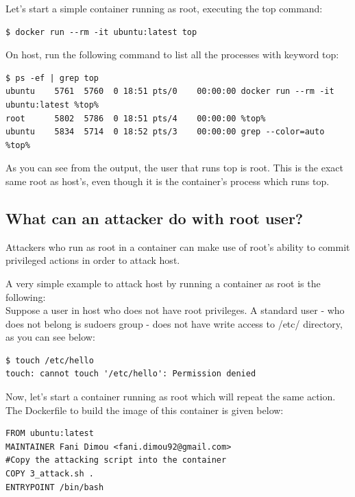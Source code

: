 Let's start a simple container running as root, executing the top command:

\begin{lstlisting}[style=dockercommands]
$ docker run --rm -it ubuntu:latest top
\end{lstlisting}

On host, run the following command to list all the processes with keyword top:
\begin{lstlisting}[style=terminal, basicstyle={\fontsize{10}{11}\color{black}\ttfamily}]
$ ps -ef | grep top
ubuntu    5761  5760  0 18:51 pts/0    00:00:00 docker run --rm -it ubuntu:latest %top%
root      5802  5786  0 18:51 pts/4    00:00:00 %top%
ubuntu    5834  5714  0 18:52 pts/3    00:00:00 grep --color=auto %top%
\end{lstlisting}

As you can see from the output, the user that runs top is root. This is the exact same root as host's, even though it is the container's process which runs top.

\subsection{What can an attacker do with root user?}
Attackers who run as root in a container can make use of root's ability to commit privileged actions in order to attack host. 

A very simple example to attack host by running a container as root is the following:
\\

Suppose a user in host who does not have root privileges. A standard user - who does not belong is sudoers group - does not have write access to /etc/ directory, as you can see below:

\begin{lstlisting}[style=terminal]
$ touch /etc/hello
touch: cannot touch '/etc/hello': Permission denied
\end{lstlisting}

Now, let's start a container running as root which will repeat the same action. The Dockerfile to build the image of this container is given below:
\\


\begin{lstlisting}[style=Dockerfile, caption={Dockerfile used for root\_attack image}]
FROM ubuntu:latest
MAINTAINER Fani Dimou <fani.dimou92@gmail.com>
#Copy the attacking script into the container
COPY 3_attack.sh .
ENTRYPOINT /bin/bash
\end{lstlisting}



